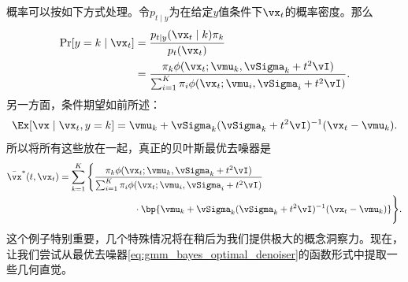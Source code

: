 \documentclass[../../book-main_zh.tex]{subfiles}
\begin{document}
\begin{example}[从高斯混合中去除高斯噪声]
    概率可以按如下方式处理。令\(p_{t \mid
    y}\)为在给定\(y\)值条件下\(\vx_{t}\)的概率密度。那么
    \begin{align}
        \Pr[y = k \mid \vx_{t}]
        &= \frac{p_{t \mid y}(\vx_{t} \mid k)\pi_{k}}{p_{t}(\vx_{t})} \\
        &= \frac{\pi_{k}\phi(\vx_{t} ; \vmu_{k}, \vSigma_{k}
        + t^{2}\vI)}{\sum_{i = 1}^{K}\pi_{i}\phi(\vx_{t} ; \vmu_{i},
        \vSigma_{i} + t^{2}\vI)}.
    \end{align}
    另一方面，条件期望如前所述：
    \begin{equation}
        \Ex[\vx \mid \vx_{t}, y = k] = \vmu_{k} +
        \vSigma_{k}(\vSigma_{k} + t^{2}\vI)^{-1}(\vx_{t} - \vmu_{k}).
    \end{equation}
    所以将所有这些放在一起，真正的贝叶斯最优去噪器是
    \begin{align}\label{eq:gmm_bayes_optimal_denoiser}
        \bar{\vx}^{\ast}(t, \vx_{t}) &= \sum_{k =
        1}^{K}\Bigg\{\frac{\pi_{k}\phi(\vx_{t}
            ;\vmu_{k}, \vSigma_{k} + t^{2}\vI)}{\sum_{i =
                1}^{K}\pi_{i}\phi(\vx_{t}
            ;\vmu_{i}, \vSigma_{i} + t^{2}\vI)}\\
            &\qquad \qquad \qquad \qquad   \cdot \bp{\vmu_{k} +
        \vSigma_{k}(\vSigma_{k} + t^{2}\vI)^{-1}(\vx_{t} - \vmu_{k})}\Bigg\}.
    \end{align}
    这个例子特别重要，几个特殊情况将在稍后为我们提供极大的概念洞察力。现在，让我们尝试从最优去噪器\eqref{eq:gmm_bayes_optimal_denoiser}的函数形式中提取一些几何直觉。


\end{example}
\end{document}
